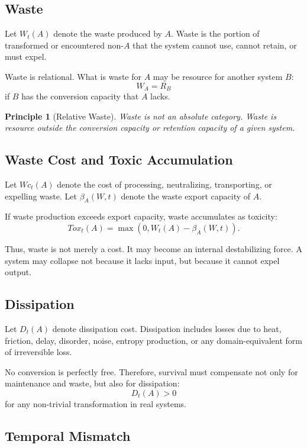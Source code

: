 \documentclass[11pt,a4paper]{article}
\newtheorem{principle}{Principle}
\begin{document}
\subsection{Waste}

Let $W_t(A)$ denote the waste produced by $A$. Waste is the portion of transformed or encountered non-$A$ that the system cannot use, cannot retain, or must expel.

Waste is relational. What is waste for $A$ may be resource for another system $B$:
\[
W_A=R_B
\]
if $B$ has the conversion capacity that $A$ lacks.

\begin{principle}[Relative Waste]
Waste is not an absolute category. Waste is resource outside the conversion capacity or retention capacity of a given system.
\end{principle}

\subsection{Waste Cost and Toxic Accumulation}

Let $Wc_t(A)$ denote the cost of processing, neutralizing, transporting, or expelling waste. Let $\beta_A(W,t)$ denote the waste export capacity of $A$.

If waste production exceeds export capacity, waste accumulates as toxicity:
\[
Tox_t(A)=\max(0,W_t(A)-\beta_A(W,t)).
\]

Thus, waste is not merely a cost. It may become an internal destabilizing force. A system may collapse not because it lacks input, but because it cannot expel output.

\subsection{Dissipation}

Let $D_t(A)$ denote dissipation cost. Dissipation includes losses due to heat, friction, delay, disorder, noise, entropy production, or any domain-equivalent form of irreversible loss.

No conversion is perfectly free. Therefore, survival must compensate not only for maintenance and waste, but also for dissipation:
\[
D_t(A)>0
\]
for any non-trivial transformation in real systems.

\subsection{Temporal Mismatch}
\end{document}
